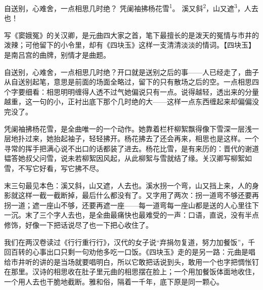 
\begin{poem}
自送别，心难舍，一点相思几时绝？
凭阑袖拂杨花雪\textsuperscript{1}。
溪又斜\textsuperscript{2}，山又遮\textsuperscript{3}，人去也！
\end{poem}

\begin{annotations}
\end{annotations}

\begin{appreciation}
写《窦娥冤》的关汉卿，是元曲四大家之首，笔下最擅长的是泼天的冤情与市井的泼辣；可他留下的小令里，却有《四块玉》这样一支清清淡淡的情词。【四块玉】是南吕宫的曲牌，别情才是曲题。

自送别，心难舍，一点相思几时绝？开口就是送别之后的事——人已经走了，曲子从自送别起笔，意思是前面的场面全略过，留下的只有散场之后的空。一点相思四个字要细看：相思明明缠得人透不过气她偏说只有一点。说得越轻，透出来的分量越重，这一句的小，正衬出底下那个几时绝的大——这样一点东西缠起来却偏偏没完没了。

凭阑袖拂杨花雪，是全曲唯一的一个动作。她靠着栏杆柳絮飘得像下雪深一层浅一层地扑过来，她抬起袖子，轻轻拂开。杨花拂去了还会再来，相思也是这样。一个寻常的挥手把满心说不出口的话都装了进去。杨花比雪，是有来历的：晋代的谢道韫答她叔父问雪，说未若柳絮因风起，从此柳絮与雪就结了缘。关汉卿写柳絮如雪，不写它好看，写它拂不尽。

末三句最见本色：溪又斜，山又遮，人去也。溪水拐一个弯，山又挡上来，人的身影就这样一截一截断掉，最后什么都没有了。又字用了两次：拐一道弯不够还要再拐一道；遮一座山不够，还要再遮一座——每一道弯每一座山都是送的人心里往下一沉。末了三个字人去也，是全曲最痛快也最难受的一声：口语，直说，没有半点修饰，好像一下把话说尽了也一下把心收住了。

我们在两汉卷读过《行行重行行》，汉代的女子说“弃捐勿复道，努力加餐饭”，千回百转的心事出口只剩一句劝他多吃一口饭。《四块玉》走的是另一路：元曲是唱给市井听的讲的是当场就要唱明白，所以它敢把话说到头，敢用一个也字把惆怅钉在那里。汉诗的相思收在肚子里元曲的相思摆在脸上；一个用加餐饭体面地收住，一个用人去也干脆地截断。雅和俗，隔着一千年，底下原是同一颗心。
\end{appreciation}
